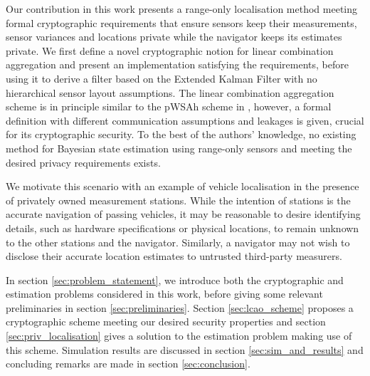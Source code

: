 \documentclass[10pt,letterpaper,oneside,twocolumn,journal]{IEEEtran}
\theoremstyle{definition}
\theoremstyle{definition}
\theoremstyle{remark}
\begin{document}
Our contribution in this work presents a range-only localisation method meeting formal cryptographic requirements that ensure sensors keep their measurements, sensor variances and locations private while the navigator keeps its estimates private. We first define a novel cryptographic notion for linear combination aggregation and present an implementation satisfying the requirements, before using it to derive a filter based on the Extended Kalman Filter with no hierarchical sensor layout assumptions. The linear combination aggregation scheme is in principle similar to the pWSAh scheme in \cite{alexandruPrivateWeightedSum2020}, however, a formal definition with different communication assumptions and leakages is given, crucial for its cryptographic security. To the best of the authors' knowledge, no existing method for Bayesian state estimation using range-only sensors and meeting the desired privacy requirements exists.

We motivate this scenario with an example of vehicle localisation in the presence of privately owned measurement stations. While the intention of stations is the accurate navigation of passing vehicles, it may be reasonable to desire identifying details, such as hardware specifications or physical locations, to remain unknown to the other stations and the navigator. Similarly, a navigator may not wish to disclose their accurate location estimates to untrusted third-party measurers.

In section \ref{sec:problem_statement}, we introduce both the cryptographic and estimation problems considered in this work, before giving some relevant preliminaries in section \ref{sec:preliminaries}. Section \ref{sec:lcao_scheme} proposes a cryptographic scheme meeting our desired security properties and section \ref{sec:priv_localisation} gives a solution to the estimation problem making use of this scheme. Simulation results are discussed in section \ref{sec:sim_and_results} and concluding remarks are made in section \ref{sec:conclusion}.

% 
% 
\end{document}
